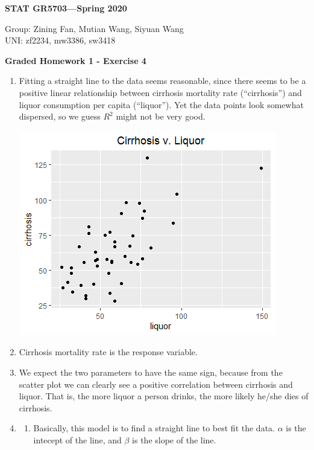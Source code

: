 \documentclass[11pt]{article}
\begin{document}
\begin{flushright}
{\bf STAT GR5703---Spring 2020}
\end{flushright}
\begin{flushleft}
Group: Zining Fan, Mutian Wang, Siyuan Wang\\
UNI: zf2234, mw3386, sw3418\\
\end{flushleft}

\bigskip
\centerline{\bf Graded Homework 1 - Exercise 4}

\bigskip
\begin{enumerate}
\item 
Fitting a straight line to the data seems reasonable, since there seems to be a positive linear relationship between cirrhosis mortality rate (``cirrhosis'') and liquor consumption per capita (``liquor''). Yet the data points look somewhat dispersed, so we guess $R^2$ might not be very good.

\begin{center}
  \includegraphics[width=0.7\linewidth]{Q4_1.png}
\end{center}

\item 
Cirrhosis mortality rate is the response variable.

\item
We expect the two parameters to have the same sign, because from the scatter plot we can clearly see a positive correlation between cirrhosis and liquor. That is, the more liquor a person drinks, the more likely he/she dies of cirrhosis. 

\item
\begin{enumerate}
\item
Basically, this model is to find a straight line to best fit the data. $\alpha$ is the intecept of the line, and $\beta$ is the slope of the line.


\end{enumerate}
\end{enumerate}
\end{document}
